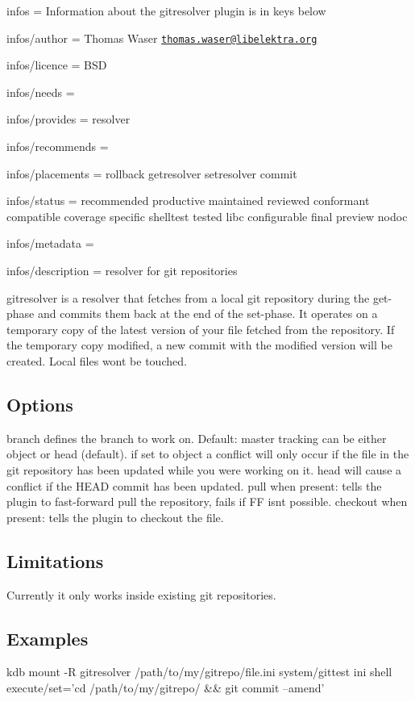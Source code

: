
\begin{DoxyItemize}
\item infos = Information about the gitresolver plugin is in keys below
\item infos/author = Thomas Waser \href{mailto:thomas.waser@libelektra.org}{\tt thomas.\+waser@libelektra.\+org}
\item infos/licence = B\+SD
\item infos/needs =
\item infos/provides = resolver
\item infos/recommends =
\item infos/placements = rollback getresolver setresolver commit
\item infos/status = recommended productive maintained reviewed conformant compatible coverage specific shelltest tested libc configurable final preview nodoc
\item infos/metadata =
\item infos/description = resolver for git repositories
\end{DoxyItemize}

gitresolver is a resolver that fetches from a local git repository during the get-\/phase and commits them back at the end of the set-\/phase. It operates on a temporary copy of the latest version of your file fetched from the repository. If the temporary copy modified, a new commit with the modified version will be created. Local files won\textquotesingle{}t be touched.

\subsection*{Options}

{\ttfamily branch} defines the branch to work on. Default\+: master {\ttfamily tracking} can be either {\ttfamily object} or {\ttfamily head} (default). if set to {\ttfamily object} a conflict will only occur if the file in the git repository has been updated while you were working on it. {\ttfamily head} will cause a conflict if the {\ttfamily H\+E\+AD} commit has been updated. {\ttfamily pull} when present\+: tells the plugin to fast-\/forward pull the repository, fails if FF isn\textquotesingle{}t possible. {\ttfamily checkout} when present\+: tells the plugin to checkout the file. \subsection*{Limitations}

Currently it only works inside existing git repositories.

\subsection*{Examples}

\begin{DoxyVerb}kdb mount -R gitresolver /path/to/my/gitrepo/file.ini system/gittest ini shell execute/set='cd /path/to/my/gitrepo/ && git commit --amend'\end{DoxyVerb}
 